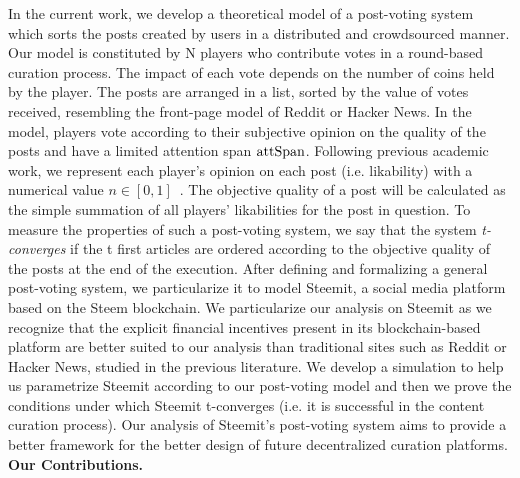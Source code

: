   
 In the current work, we develop a theoretical model of a post-voting system which sorts the posts created by users in a distributed and crowdsourced manner. 
  Our model is constituted by N players who contribute votes in a round-based curation process. The impact of each vote depends on the number of coins held by the player.
   The posts are arranged in a list, sorted by the value of votes received, resembling the front-page model of Reddit or Hacker News. In the model, players vote according to their subjective opinion on the quality of the posts and have a limited attention span $\mathrm{attSpan}$.  
   Following previous academic work, we represent each player's opinion on each post (i.e. likability) with a numerical value $n \in [ 0,1 ]$~\cite{ghosh2011incentivizing,askalidis2013theoretical}.  
   The objective quality of a post will be calculated as the simple summation of all players' likabilities for the post in question. To measure the properties of such a post-voting system, we say that the system \textit{t-converges} if the t first articles are ordered according to the objective quality of the posts at the end of the execution.
  After defining and formalizing a general post-voting system, we particularize it to model Steemit, a social media platform based on the Steem blockchain. 
  We particularize our analysis on Steemit as we recognize that the explicit financial incentives present in its blockchain-based platform are better suited to our analysis than traditional sites such as Reddit or Hacker News, studied in the previous literature. 
  We develop a simulation to help us parametrize Steemit according to our post-voting model and then we prove the conditions under which Steemit t-converges (i.e. it is successful in the content curation process).
   Our analysis of Steemit's post-voting system aims to provide a better framework for the better design of future decentralized curation platforms.\\ 

  
  \textbf{Our Contributions.}  
  
